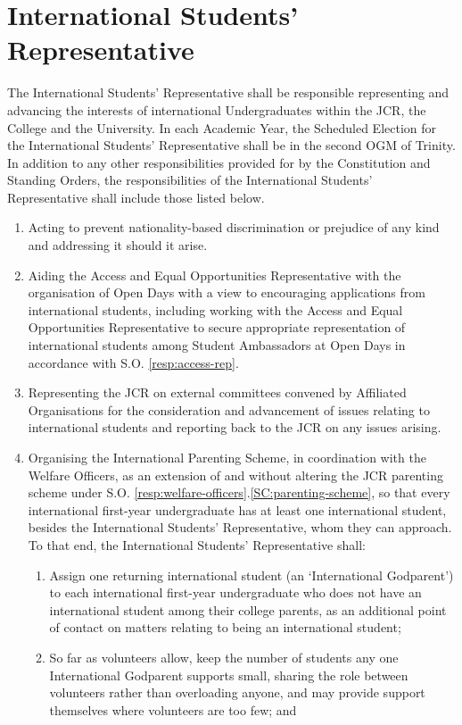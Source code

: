 \section{International Students' Representative}
\npara The International Students' Representative shall be responsible representing and advancing the interests of international Undergraduates within the JCR, the College and the University.
\npara In each Academic Year, the Scheduled Election for the International Students' Representative shall be in the second OGM of Trinity.
\npara In addition to any other responsibilities provided for by the Constitution and Standing Orders, the responsibilities of the International Students' Representative shall include those listed below.
\begin{enumerate}
	\item Acting to prevent nationality-based discrimination or prejudice of any kind and addressing it should it arise.
	\item Aiding the Access and Equal Opportunities Representative with the organisation of Open Days with a view to encouraging applications from international students, including working with the Access and Equal Opportunities Representative to secure appropriate representation of international students among Student Ambassadors at Open Days in accordance with S.O. \ref{resp:access-rep}. 
	\item Representing the JCR on external committees convened by Affiliated Organisations for the consideration and advancement of issues relating to international students and reporting back to the JCR on any issues arising.
	\item Organising the International Parenting Scheme, in coordination with the Welfare Officers, as an extension of and without altering the JCR parenting scheme under S.O. \ref{resp:welfare-officers}.\ref{SC:parenting-scheme}, so that every international first-year undergraduate has at least one international student, besides the International Students’ Representative, whom they can approach. To that end, the International Students’ Representative shall: 
    \begin{enumerate}
        \item  Assign one returning international student (an ‘International Godparent’) to each international first-year undergraduate who does not have an international student among their college parents, as an additional point of contact on matters relating to being an international student;
        \item So far as volunteers allow, keep the number of students any one International Godparent supports small, sharing the role between volunteers rather than overloading anyone, and may provide support themselves where volunteers are too few; and 

\end{enumerate}
\end{enumerate}
